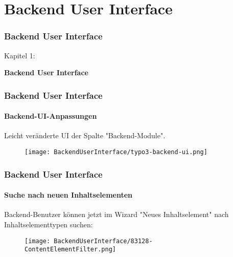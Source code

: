 %

\section{Backend User Interface}
\begin{frame}[fragile]
	\frametitle{Backend User Interface}

	\begin{center}\huge{Kapitel 1:}\end{center}
	\begin{center}\huge{\color{typo3darkgrey}\textbf{Backend User Interface}}\end{center}

\end{frame}


\begin{frame}[fragile]
	\frametitle{Backend User Interface}
	\framesubtitle{Backend-UI-Anpassungen}

	Leicht veränderte UI der Spalte "Backend-Module".

	\begin{figure}
		\texttt{[image: BackendUserInterface/typo3-backend-ui.png]}
	\end{figure}

\end{frame}


\begin{frame}[fragile]
	\frametitle{Backend User Interface}
	\framesubtitle{Suche nach neuen Inhaltselementen}

	Backend-Benutzer können jetzt im Wizard "Neues Inhaltselement" nach Inhaltselementtypen suchen:

	\begin{figure}
		\texttt{[image: BackendUserInterface/83128-ContentElementFilter.png]}
	\end{figure}

\end{frame}

